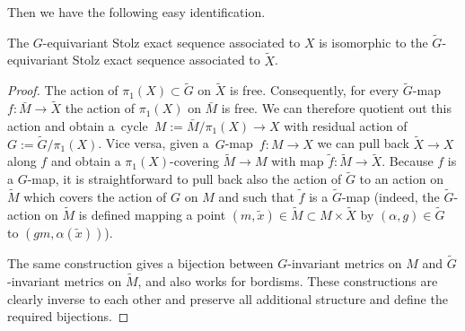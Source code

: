 	
	Then we have the following easy identification.
	\begin{Proposition}\label{extension}
		The $G$-equivariant Stolz exact sequence associated to $X$ is isomorphic to
		the $\widetilde{G}$-equivariant Stolz exact sequence associated to
		$\tilde{X}$.
	\end{Proposition}
	\begin{proof}
		The action of $\pi_1(X)\subset \widetilde{G}$ on $\tilde X$ is
		free. Consequently, for every $\widetilde{G}$-map ${f\colon \bar M\to\tilde X}$ the
		action of $\pi_1(X)$ on $\bar M$ is free. We can therefore quotient out this
		action and obtain a~cycle~${M:=\bar M/\pi_1(X)\to X}$ with residual action of
		$G:=\widetilde{G}/\pi_1(X)$.
		Vice versa, given a~$G$-map~${f\colon M\to X}$ we can pull back $\tilde X\to
		X$ along $f$ and obtain a $\pi_1(X)$-covering $\tilde M\to M$ with map
		$\tilde f\colon \tilde M\to \tilde X$. Because $f$ is a $G$-map, it is
		straightforward to pull back
		also the action of $\widetilde{G}$ to an action on $\tilde M$ which covers
		the action of $G$ on $M$ and such that $\tilde f$ is a $\widetilde{G}$-map
		(indeed, the $\widetilde{G}$-action on $\tilde M$ is defined mapping a point
		$(m,\tilde x)\in \tilde M\subset M\times \tilde X$ by
		$(\alpha,g)\in\widetilde{G}$ to $(gm,\alpha(\tilde x))$).
		
		The same construction gives a bijection between $G$-invariant metrics on $M$
		and $\widetilde{G}$-invariant metrics on $\tilde M$, and also works for
		bordisms.
		These constructions are clearly inverse to each other and preserve all
		additional structure and define the required bijections.
	\end{proof}
	
